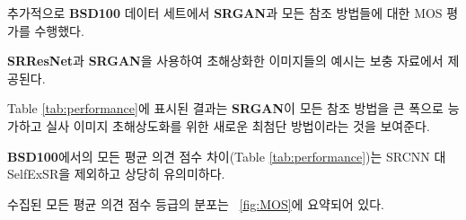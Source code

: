 \documentclass[10pt,twocolumn,letterpaper]{article}
\newcommand{\kor}[1]{#1}
\newcommand{\eng}[1]{}
\newcommand{\summary}[1]{}
\begin{document}
\eng{
We further obtained \ac{MOS} ratings for \textbf{SRGAN} and all reference methods on \textbf{BSD100}.
}\kor{
추가적으로 \textbf{BSD100} 데이터 세트에서 \textbf{SRGAN}과 모든 참조 방법들에 대한 \ac{MOS} 평가를 수행했다.
} \eng{
Examples of images super-resolved with \textbf{SRResNet} and \textbf{SRGAN} are depicted in the supplementary material.
}\kor{
\textbf{SRResNet}과 \textbf{SRGAN}을 사용하여 초해상화한 이미지들의 예시는 보충 자료에서 제공된다.
}
\eng{
The results shown in Table \ref{tab:performance} confirm that \textbf{SRGAN} outperforms all reference methods by a large margin and sets a new state of the art for photo-realistic image \ac{SR}.
}\kor{
Table \ref{tab:performance}에 표시된 결과는 \textbf{SRGAN}이 모든 참조 방법을 큰 폭으로 능가하고 실사 이미지 초해상도화를 위한 새로운 최첨단 방법이라는 것을 보여준다.
} \eng{
All differences in \ac{MOS} (\cf Table \ref{tab:performance}) are highly significant on \textbf{BSD100}, except SRCNN vs. SelfExSR.
}\kor{
\textbf{BSD100}에서의 모든 \ac{평균 의견 점수} 차이(\cf Table \ref{tab:performance})는 SRCNN 대 SelfExSR을 제외하고 상당히 유의미하다.
} \eng{
The distribution of all collected \ac{MOS} ratings is summarized in \figurename~\ref{fig:MOS}.
}\kor{
수집된 모든 \ac{평균 의견 점수} 등급의 분포는 \figurename~\ref{fig:MOS}에 요약되어 있다.
}

\summary{
다른 참조 방법들을 큰 폭으로 능가하고 실사 이미지 초해상도화를 위한 새로운 최첨단 방법이 된 SRGAN
}
\end{document}
